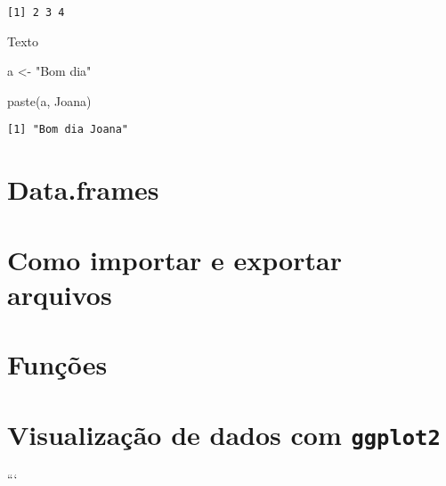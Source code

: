 \documentclass[
  letterpaper,
  DIV=11,
  numbers=noendperiod]{scrreprt}
\newenvironment{Shaded}{\begin{snugshade}}{\end{snugshade}}
\newcommand{\FunctionTok}[1]{\textcolor[rgb]{0.28,0.35,0.67}{#1}}
\newcommand{\NormalTok}[1]{\textcolor[rgb]{0.00,0.23,0.31}{#1}}
\newcommand{\OtherTok}[1]{\textcolor[rgb]{0.00,0.23,0.31}{#1}}
\newcommand{\StringTok}[1]{\textcolor[rgb]{0.13,0.47,0.30}{#1}}
\begin{document}
\begin{verbatim}
[1] 2 3 4
\end{verbatim}

Texto

\begin{Shaded}
\begin{Highlighting}[]
\NormalTok{a }\OtherTok{\textless{}{-}} \StringTok{"Bom dia"}

\FunctionTok{paste}\NormalTok{(a, }\StringTok{\textquotesingle{}Joana\textquotesingle{}}\NormalTok{)}
\end{Highlighting}
\end{Shaded}

\begin{verbatim}
[1] "Bom dia Joana"
\end{verbatim}

\hypertarget{data.frames}{%
\section{Data.frames}\label{data.frames}}

\hypertarget{como-importar-e-exportar-arquivos}{%
\section{Como importar e exportar
arquivos}\label{como-importar-e-exportar-arquivos}}

\hypertarget{funuxe7uxf5es}{%
\section{Funções}\label{funuxe7uxf5es}}

\hypertarget{visualizauxe7uxe3o-de-dados-com-ggplot2}{%
\section{\texorpdfstring{Visualização de dados com
\texttt{ggplot2}}{Visualização de dados com ggplot2}}\label{visualizauxe7uxe3o-de-dados-com-ggplot2}}

```
\end{document}
